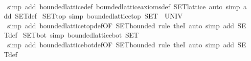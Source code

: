\begin{isabellebody}
%
\isadelimproof
\ \ %
\endisadelimproof
%
\isatagproof
{}\isamarkupfalse%
\ {}simp\ add{}\ bounded{}lattice{}def\ bounded{}lattice{}axioms{}def\ SET{}lattice{}\ {}auto\ simp\ add{}\ SET{}def{}%
\endisatagproof
{\isafoldproof}%
%
\isadelimproof
\isanewline
%
\endisadelimproof
\isanewline
{}\isamarkupfalse%
\ SET{}top\ {}simp{}{}\ {}bounded{}lattice{}top\ SET\ {}\ UNIV{}\isanewline
%
\isadelimproof
\ \ %
\endisadelimproof
%
\isatagproof
{}\isamarkupfalse%
\ {}simp\ add{}\ bounded{}lattice{}top{}def{}OF\ SET{}bounded{}{}\ rule\ the{}I{}{}\ auto\ simp\ add{}\ SET{}def{}%
\endisatagproof
{\isafoldproof}%
%
\isadelimproof
\isanewline
%
\endisadelimproof
\isanewline
{}\isamarkupfalse%
\ SET{}bot\ {}simp{}{}\ {}bounded{}lattice{}bot\ SET\ {}\ {}{}{}\isanewline
%
\isadelimproof
\ \ %
\endisadelimproof
%
\isatagproof
{}\isamarkupfalse%
\ {}simp\ add{}\ bounded{}lattice{}bot{}def{}OF\ SET{}bounded{}{}\ rule\ the{}I{}{}\ auto\ simp\ add{}\ SET{}def{}%

\end{isabellebody}
